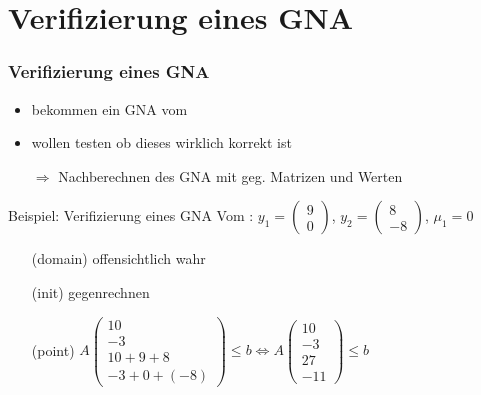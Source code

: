 \section{Verifizierung eines GNA}
\frame{\tableofcontents[currentsection]}
\begin{frame}
	\frametitle{\color{white}Verifizierung eines GNA}
	\begin{itemize}
		\item bekommen ein GNA vom \solver
		\item wollen testen ob dieses wirklich korrekt ist
		\item[$\Rightarrow$] Nachberechnen des GNA mit geg. Matrizen und Werten
	\end{itemize}
	\begin{exampleblock}{Beispiel: Verifizierung eines GNA }
		Vom \solver: $y_1=\begin{pmatrix} 9 \\ 0 \end{pmatrix}$, $y_2=\begin{pmatrix} 8 \\ -8 \end{pmatrix}$, $\mu_1=0$\newline
		\vspace*{-.8em}
		\begin{itemize}
			\setlength{\itemindent}{1.5cm}
			\item[(domain)] offensichtlich wahr \checkmark
			\item[(init)] gegenrechnen \stem \checkmark %
			\item[(point)]  $A\begin{pmatrix} 10 \\ -3 \\ 10+9+8 \\ -3 + 0 + (-8) \end{pmatrix} \le b \Leftrightarrow A\begin{pmatrix} 10 \\ -3 \\ 27 \\ -11 \end{pmatrix} \le b$ \checkmark
		\end{itemize}
	\end{exampleblock}
\end{frame}

